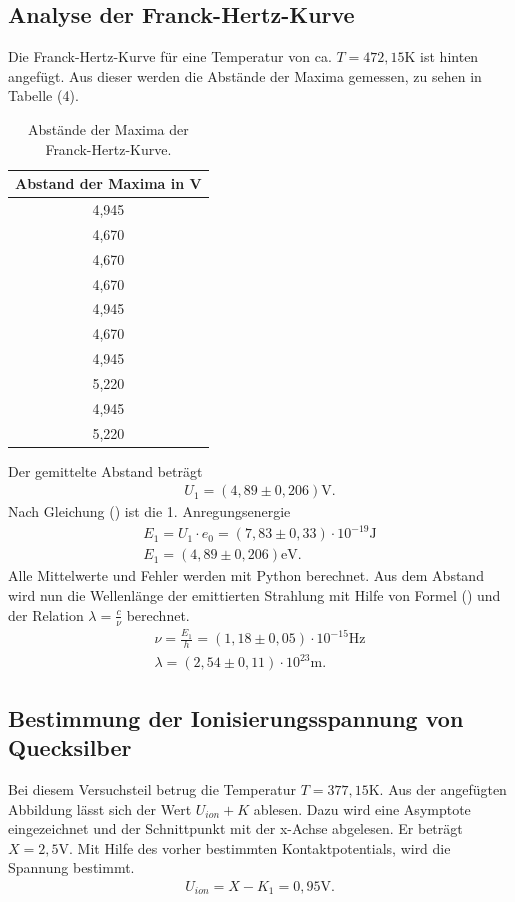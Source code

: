 \subsection{Analyse der Franck-Hertz-Kurve}
Die Franck-Hertz-Kurve für eine Temperatur von ca. $T=472,15 \si{\K}$ ist hinten angefügt.
Aus dieser werden die Abstände der Maxima gemessen, zu sehen in Tabelle (4).

\begin{table}[H]
  \centering
  \caption{Abstände der Maxima der Franck-Hertz-Kurve.}
  \label{tab:Parameter}
  \begin{tabular}{c }
    \toprule
     Abstand der Maxima in V \\
    \bottomrule
     4,945\\
     4,670\\
     4,670\\
     4,670\\
     4,945\\
    4,670\\
    4,945\\
    5,220\\
     4,945\\
    5,220\\
   \bottomrule
  \end{tabular}
\end{table}

Der gemittelte Abstand beträgt
\begin{align}
U_1 = (4,89 \pm 0,206) \si{\V}.
\end{align}
Nach Gleichung () ist die 1. Anregungsenergie
\begin{align}
E_1 = U_1 \cdot e_0 = (7,83 \pm 0,33)\cdot 10^{-19} \si{\J} \\
E_1 = (4,89 \pm 0,206) \si{\eV}.
\end{align}
Alle Mittelwerte und Fehler werden mit Python berechnet.
Aus dem Abstand wird nun die Wellenlänge der emittierten Strahlung mit Hilfe von Formel () und der Relation $\lambda = \frac{c}{\nu} $ berechnet.
\begin{align}
\nu = \frac{E_1}{h} = (1,18 \pm 0,05)\cdot 10^{-15} \si{\Hz}\\
\lambda = (2,54 \pm 0,11)\cdot 10^{23} \si{\m}.
\end{align}


\subsection{Bestimmung der Ionisierungsspannung von Quecksilber}
Bei diesem Versuchsteil betrug die Temperatur $T= 377,15\si{\K}$.
Aus der angefügten Abbildung lässt sich der Wert $U_{ion}+K$ ablesen.
Dazu wird eine Asymptote eingezeichnet und der Schnittpunkt mit der x-Achse abgelesen.
Er beträgt $X = 2,5 \si{\V}$. Mit Hilfe des vorher bestimmten Kontaktpotentials, wird die Spannung bestimmt.
\begin{align}
U_{ion} = X-K_1 = 0,95\si{\V}.
\end{align}